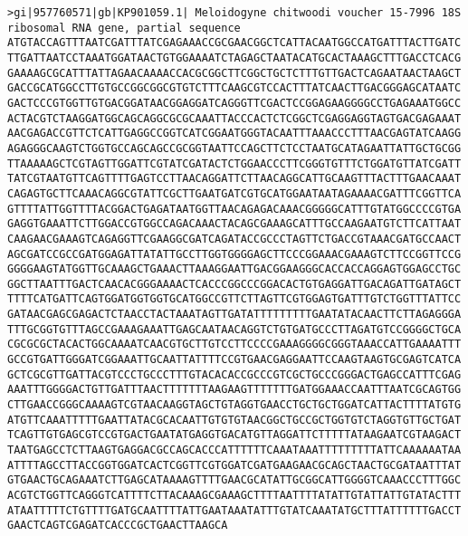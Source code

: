 \documentclass[11pt]{article}
\begin{document}
\begin{Verbatim}[commandchars=\\\{\}]
>gi|957760571|gb|KP901059.1| Meloidogyne chitwoodi voucher 15-7996 18S ribosomal RNA gene, partial sequence
ATGTACCAGTTTAATCGATTTATCGAGAAACCGCGAACGGCTCATTACAATGGCCATGATTTACTTGATC
TTGATTAATCCTAAATGGATAACTGTGGAAAATCTAGAGCTAATACATGCACTAAAGCTTTGACCTCACG
GAAAAGCGCATTTATTAGAACAAAACCACGCGGCTTCGGCTGCTCTTTGTTGACTCAGAATAACTAAGCT
GACCGCATGGCCTTGTGCCGGCGGCGTGTCTTTCAAGCGTCCACTTTATCAACTTGACGGGAGCATAATC
GACTCCCGTGGTTGTGACGGATAACGGAGGATCAGGGTTCGACTCCGGAGAAGGGGCCTGAGAAATGGCC
ACTACGTCTAAGGATGGCAGCAGGCGCGCAAATTACCCACTCTCGGCTCGAGGAGGTAGTGACGAGAAAT
AACGAGACCGTTCTCATTGAGGCCGGTCATCGGAATGGGTACAATTTAAACCCTTTAACGAGTATCAAGG
AGAGGGCAAGTCTGGTGCCAGCAGCCGCGGTAATTCCAGCTTCTCCTAATGCATAGAATTATTGCTGCGG
TTAAAAAGCTCGTAGTTGGATTCGTATCGATACTCTGGAACCCTTCGGGTGTTTCTGGATGTTATCGATT
TATCGTAATGTTCAGTTTTGAGTCCTTAACAGGATTCTTAACAGGCATTGCAAGTTTACTTTGAACAAAT
CAGAGTGCTTCAAACAGGCGTATTCGCTTGAATGATCGTGCATGGAATAATAGAAAACGATTTCGGTTCA
GTTTTATTGGTTTTACGGACTGAGATAATGGTTAACAGAGACAAACGGGGGCATTTGTATGGCCCCGTGA
GAGGTGAAATTCTTGGACCGTGGCCAGACAAACTACAGCGAAAGCATTTGCCAAGAATGTCTTCATTAAT
CAAGAACGAAAGTCAGAGGTTCGAAGGCGATCAGATACCGCCCTAGTTCTGACCGTAAACGATGCCAACT
AGCGATCCGCCGATGGAGATTATATTGCCTTGGTGGGGAGCTTCCCGGAAACGAAAGTCTTCCGGTTCCG
GGGGAAGTATGGTTGCAAAGCTGAAACTTAAAGGAATTGACGGAAGGGCACCACCAGGAGTGGAGCCTGC
GGCTTAATTTGACTCAACACGGGAAAACTCACCCGGCCCGGACACTGTGAGGATTGACAGATTGATAGCT
TTTTCATGATTCAGTGGATGGTGGTGCATGGCCGTTCTTAGTTCGTGGAGTGATTTGTCTGGTTTATTCC
GATAACGAGCGAGACTCTAACCTACTAAATAGTTGATATTTTTTTTTGAATATACAACTTCTTAGAGGGA
TTTGCGGTGTTTAGCCGAAAGAAATTGAGCAATAACAGGTCTGTGATGCCCTTAGATGTCCGGGGCTGCA
CGCGCGCTACACTGGCAAAATCAACGTGCTTGTCCTTCCCCGAAAGGGGCGGGTAAACCATTGAAAATTT
GCCGTGATTGGGATCGGAAATTGCAATTATTTTCCGTGAACGAGGAATTCCAAGTAAGTGCGAGTCATCA
GCTCGCGTTGATTACGTCCCTGCCCTTTGTACACACCGCCCGTCGCTGCCCGGGACTGAGCCATTTCGAG
AAATTTGGGGACTGTTGATTTAACTTTTTTTAAGAAGTTTTTTTGATGGAAACCAATTTAATCGCAGTGG
CTTGAACCGGGCAAAAGTCGTAACAAGGTAGCTGTAGGTGAACCTGCTGCTGGATCATTACTTTTATGTG
ATGTTCAAATTTTTGAATTATACGCACAATTGTGTGTAACGGCTGCCGCTGGTGTCTAGGTGTTGCTGAT
TCAGTTGTGAGCGTCCGTGACTGAATATGAGGTGACATGTTAGGATTCTTTTTATAAGAATCGTAAGACT
TAATGAGCCTCTTAAGTGAGGACGCCAGCACCCATTTTTTCAAATAAATTTTTTTTTATTCAAAAAATAA
ATTTTAGCCTTACCGGTGGATCACTCGGTTCGTGGATCGATGAAGAACGCAGCTAACTGCGATAATTTAT
GTGAACTGCAGAAATCTTGAGCATAAAAGTTTTGAACGCATATTGCGGCATTGGGGTCAAACCCTTTGGC
ACGTCTGGTTCAGGGTCATTTTCTTACAAAGCGAAAGCTTTTAATTTTATATTGTATTATTGTATACTTT
ATAATTTTTCTGTTTTGATGCAATTTTATTGAATAAATATTTGTATCAAATATGCTTTATTTTTTGACCT
GAACTCAGTCGAGATCACCCGCTGAACTTAAGCA


\end{Verbatim}
\end{document}
